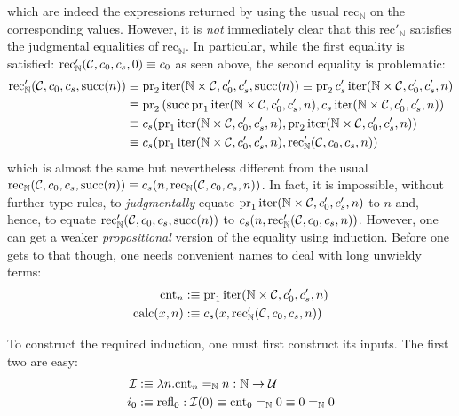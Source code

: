 which are indeed the expressions returned by using the usual $\text{rec}_{\mathbb{N}}$ on the corresponding values. However, it is \textit{not} immediately clear that this $\text{rec}'_{\mathbb{N}}$ satisfies the judgmental equalities of $\text{rec}_{\mathbb{N}}$. In particular, while the first equality is satisfied: $\text{rec}'_{\mathbb{N}}(\mathcal{C}, c_{0}, c_{s}, 0) \equiv c_{0}$ as seen above, the second equality is problematic:
\begin{align*}
	\text{rec}'_{\mathbb{N}}(\mathcal{C}, c_{0}, c_{s}, \text{succ}(n)) &\equiv \text{pr}_{2}\,\text{iter}(\mathbb{N} \times \mathcal{C}, c'_{0}, c'_{s}, \text{succ}(n)) \equiv \text{pr}_{2}\,c'_{s}\,\text{iter}(\mathbb{N} \times \mathcal{C}, c'_{0}, c'_{s}, n) \\
	&\equiv \text{pr}_{2}\,(\text{succ}\,\text{pr}_{1}\,\text{iter}(\mathbb{N} \times \mathcal{C}, c'_{0}, c'_{s}, n), c_{s}\,\text{iter}(\mathbb{N} \times \mathcal{C}, c'_{0}, c'_{s}, n)) \\
	&\equiv c_{s}(\text{pr}_{1}\,\text{iter}(\mathbb{N} \times \mathcal{C}, c'_{0}, c'_{s}, n),\text{pr}_{2}\,\text{iter}(\mathbb{N} \times \mathcal{C}, c'_{0}, c'_{s}, n)) \\
	&\equiv c_{s}(\text{pr}_{1}\,\text{iter}(\mathbb{N} \times \mathcal{C}, c'_{0}, c'_{s}, n),\text{rec}'_{\mathbb{N}}(\mathcal{C}, c_{0}, c_{s}, n))
\end{align*}
which is almost the same but nevertheless different from the usual $\text{rec}_{\mathbb{N}}(\mathcal{C}, c_{0}, c_{s}, \text{succ}(n)) \equiv c_{s}(n, \text{rec}_{\mathbb{N}}(\mathcal{C}, c_{0}, c_{s}, n))$. In fact, it is impossible, without further type rules, to \textit{judgmentally} equate $\text{pr}_{1}\,\text{iter}(\mathbb{N} \times \mathcal{C}, c'_{0}, c'_{s}, n)$ to $n$ and, hence, to equate $\text{rec}'_{\mathbb{N}}(\mathcal{C}, c_{0}, c_{s}, \text{succ}(n))$ to $c_{s}(n, \text{rec}'_{\mathbb{N}}(\mathcal{C}, c_{0}, c_{s}, n))$. However, one can get a weaker \textit{propositional} version of the equality using induction. Before one gets to that though, one needs convenient names to deal with long unwieldy terms:
\begin{align*}
	\text{cnt}_{n} &:\equiv \text{pr}_{1}\,\text{iter}(\mathbb{N} \times \mathcal{C}, c'_{0}, c'_{s}, n) \\
	\text{calc}(x,n) &:\equiv c_{s}(x,\text{rec}'_{\mathbb{N}}(\mathcal{C}, c_{0}, c_{s}, n))
\end{align*}

To construct the required induction, one must first construct its inputs. The first two are easy:
\begin{align*}
	\mathcal{I} &:\equiv \lambda n.\text{cnt}_{n} =_{\mathbb{N}} n : \mathbb{N} \to \mathcal{U} \\
	i_{0} &:\equiv \text{refl}_{0} : \mathcal{I}(0) \equiv \text{cnt}_{0} =_{\mathbb{N}} 0 \equiv 0 =_{\mathbb{N}} 0
\end{align*}

